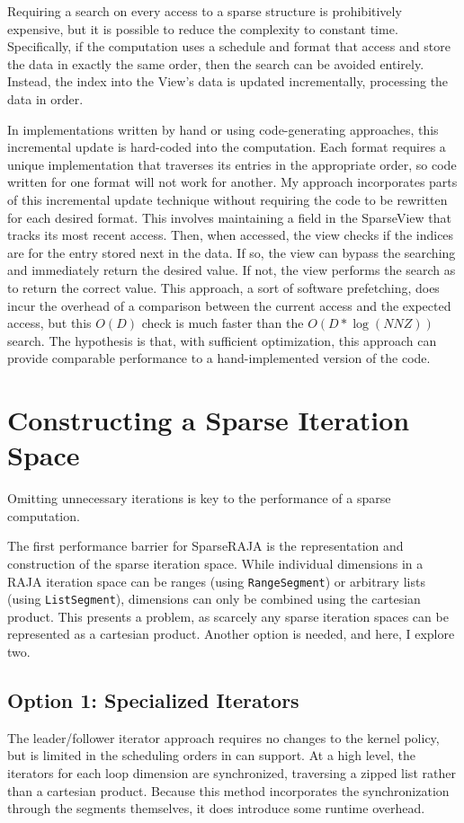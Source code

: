 Requiring a search on every access to a sparse structure is prohibitively expensive, but it is possible to reduce the complexity to constant time.
Specifically, if the computation uses a schedule and format that access and store the data in exactly the same order, then the search can be avoided entirely.
Instead, the index into the View's data is updated incrementally, processing the data in order.

In implementations written by hand or using code-generating approaches, this incremental update is hard-coded into the computation.
Each format requires a unique implementation that traverses its entries in the appropriate order, so code written for one format will not work for another.
My approach incorporates parts of this incremental update technique without requiring the code to be rewritten for each desired format. 
This involves maintaining a field in the SparseView that tracks its most recent access.
Then, when accessed, the view checks if the indices are for the entry stored next in the data. 
If so, the view can bypass the searching and immediately return the desired value. 
If not, the view performs the search as to return the correct value. 
This approach, a sort of software prefetching, does incur the overhead of a comparison between the current access and the expected access, but this $O(D)$ check is much faster than the $O(D*\log(NNZ))$ search.
The hypothesis is that, with sufficient optimization, this approach can provide comparable performance to a hand-implemented version of the code.

\section{Constructing a Sparse Iteration Space}
\label{sec:sparseIterspace}
Omitting unnecessary iterations is key to the performance of a sparse computation. 


The first performance barrier for SparseRAJA is the representation and construction of the sparse iteration space.
While individual dimensions in a RAJA iteration space can be ranges (using \verb.RangeSegment.) or arbitrary lists (using \verb.ListSegment.), dimensions can only be combined using the cartesian product. 
This presents a problem, as scarcely any sparse iteration spaces can be represented as a cartesian product.
Another option is needed, and here, I explore two.


\subsection{Option 1: Specialized Iterators}
The leader/follower iterator approach requires no changes to the kernel policy, but is limited in the scheduling orders in can support. 
At a high level, the iterators for each loop dimension are synchronized, traversing a zipped list rather than a cartesian product. 
Because this method incorporates the synchronization through the segments themselves, it does introduce some runtime overhead.


